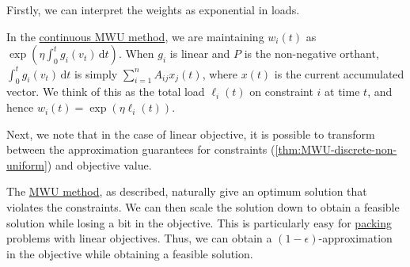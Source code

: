 Firstly, we can interpret the weights as exponential in loads.

\begin{intuition}
	In the \hyperref[thm:MWU-continuous]{continuous MWU method}, we are maintaining \(w_i(t)\) as \(\exp (\eta \int_{0}^{t} g_i(v_t) \,\mathrm{d}t )\). When \(g_i\) is linear and \(P\) is the non-negative orthant, \(\int_{0}^{t} g_i(v_t) \,\mathrm{d}t \) is simply \(\sum_{i=1}^{n} A_{ij} x_j(t)\), where \(x(t)\) is the current accumulated vector. We think of this as the total load \(\ell _i(t)\) on constraint \(i\) at time \(t\), and hence \(w_i(t) = \exp (\eta \ell _i(t))\).
\end{intuition}

Next, we note that in the case of linear objective, it is possible to transform between the approximation guarantees for constraints (\autoref{thm:MWU-discrete-non-uniform}) and objective value.

\begin{remark}
	The \hyperref[thm:MWU-discrete-non-uniform]{MWU method}, as described, naturally give an optimum solution that violates the constraints. We can then scale the solution down to obtain a feasible solution while losing a bit in the objective. This is particularly easy for \hyperref[def:packing-LP]{packing} problems with linear objectives. Thus, we can obtain a \((1 - \epsilon )\)-approximation in the objective while obtaining a feasible solution.
\end{remark}

